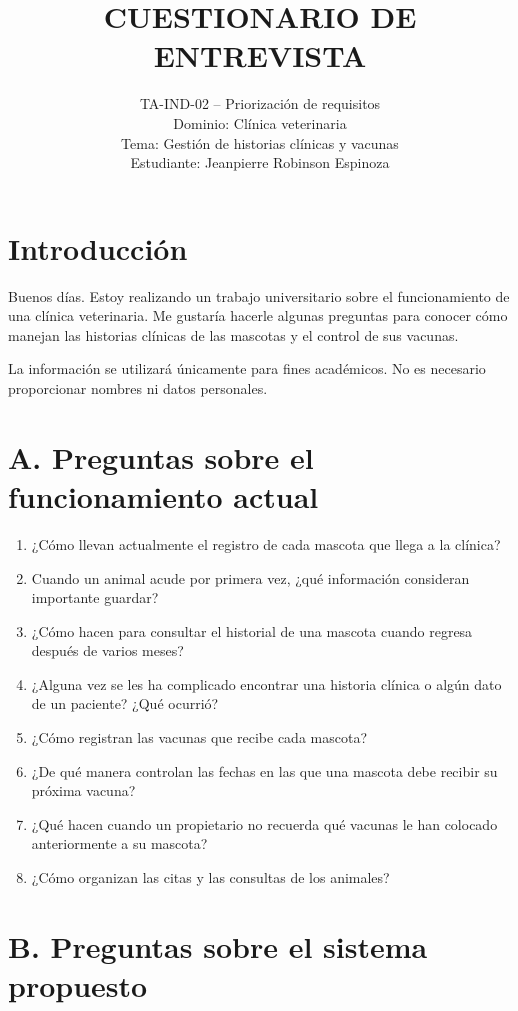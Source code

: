 \documentclass[11pt,a4paper]{article}
\title{\textbf{CUESTIONARIO DE ENTREVISTA}}
\author{TA-IND-02 -- Priorización de requisitos\\
Dominio: Clínica veterinaria\\
Tema: Gestión de historias clínicas y vacunas\\
Estudiante: Jeanpierre Robinson Espinoza}
\date{}
\begin{document}
\maketitle

\section*{Introducción}

Buenos días. Estoy realizando un trabajo universitario sobre el funcionamiento de una clínica veterinaria. Me gustaría hacerle algunas preguntas para conocer cómo manejan las historias clínicas de las mascotas y el control de sus vacunas.

La información se utilizará únicamente para fines académicos. No es necesario proporcionar nombres ni datos personales.

\section*{A. Preguntas sobre el funcionamiento actual}

\begin{enumerate}[leftmargin=*]
  \item ¿Cómo llevan actualmente el registro de cada mascota que llega a la clínica?
  \item Cuando un animal acude por primera vez, ¿qué información consideran importante guardar?
  \item ¿Cómo hacen para consultar el historial de una mascota cuando regresa después de varios meses?
  \item ¿Alguna vez se les ha complicado encontrar una historia clínica o algún dato de un paciente? ¿Qué ocurrió?
  \item ¿Cómo registran las vacunas que recibe cada mascota?
  \item ¿De qué manera controlan las fechas en las que una mascota debe recibir su próxima vacuna?
  \item ¿Qué hacen cuando un propietario no recuerda qué vacunas le han colocado anteriormente a su mascota?
  \item ¿Cómo organizan las citas y las consultas de los animales?
\end{enumerate}

\section*{B. Preguntas sobre el sistema propuesto}
\end{document}

